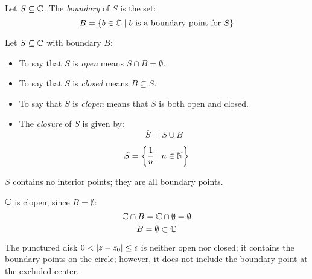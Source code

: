 \documentclass[letterpaper,12pt,fleqn]{article}
\newcommand{\e}{\epsilon}
\begin{document}
\begin{definition}
  Let $S\subseteq\mathbb{C}$. The \emph{boundary} of $S$ is the set:
  \[B=\{b\in\mathbb{C}\mid b\ \mbox{is a boundary point for}\ S\}\]
\end{definition}

\begin{definition}
  Let $S\subseteq\mathbb{C}$ with boundary $B$:
  \begin{itemize}
  \item To say that $S$ is \emph{open} means $S\cap B=\emptyset$.
  \item To say that $S$ is \emph{closed} means $B\subseteq S$.
  \item To say that $S$ is \emph{clopen} means that $S$ is both open and
    closed.
  \item The \emph{closure} of $S$ is given by:
    \[\bar{S}=S\cup B\]
  \end{itemize}
\end{definition}

\begin{example}
  \[S=\left\{\frac{1}{n}\mid n\in\mathbb{N}\right\}\]

  \bigskip
  
  \begin{minipage}{3in}
  \end{minipage}
  \begin{minipage}{3in}
    $S$ contains no interior points; they are all boundary points.
  \end{minipage}
\end{example}

\begin{example}
  $\mathbb{C}$ is clopen, since $B=\emptyset$:
  \[\mathbb{C}\cap B=\mathbb{C}\cap\emptyset=\emptyset\]
  \[B=\emptyset\subset\mathbb{C}\]
\end{example}

\begin{example}
  The punctured disk $0<\abs{z-z_0}\le\e$ is neither open nor closed; it
  contains the boundary points on the circle; however, it does not include the
  boundary point at the excluded center.
\end{example}
\end{document}

